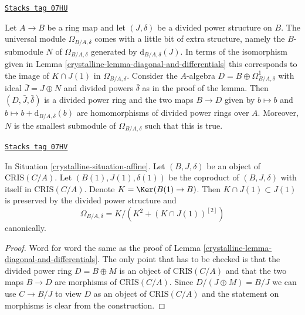 \begin{remark}
\label{crystalline-remark-filtration-differentials}
\href{https://stacks.math.columbia.edu/tag/07HU}{\texttt{Stacks tag 07HU}}

Let $A \to B$ be a ring map and let $(J, \delta)$ be a divided
power structure on $B$. The universal module $\Omega_{B/A, \delta}$
comes with a little bit of extra structure, namely the $B$-submodule
$N$ of $\Omega_{B/A, \delta}$ generated by $\text{d}_{B/A, \delta}(J)$.
In terms of the isomorphism given in
Lemma \ref{crystalline-lemma-diagonal-and-differentials}
this corresponds to the image of
$K \cap J(1)$ in $\Omega_{B/A, \delta}$. Consider the $A$-algebra
$D = B \oplus \Omega^1_{B/A, \delta}$ with ideal $\bar J = J \oplus N$
and divided powers $\bar \delta$ as in the proof of the lemma.
Then $(D, \bar J, \bar \delta)$ is a divided power ring
and the two maps $B \to D$ given by $b \mapsto b$ and
$b \mapsto b + \text{d}_{B/A, \delta}(b)$
are homomorphisms of divided power rings over $A$. Moreover, $N$
is the smallest submodule of $\Omega_{B/A, \delta}$ such that this is true.
\end{remark}

\begin{lemma}
\label{crystalline-lemma-diagonal-and-differentials-affine-site}
\href{https://stacks.math.columbia.edu/tag/07HV}{\texttt{Stacks tag 07HV}}

In Situation \ref{crystalline-situation-affine}.
Let $(B, J, \delta)$ be an object of $\text{CRIS}(C/A)$.
Let $(B(1), J(1), \delta(1))$ be the coproduct of $(B, J, \delta)$
with itself in $\text{CRIS}(C/A)$. Denote
$K = \Ker(B(1) \to B)$. Then $K \cap J(1) \subset J(1)$
is preserved by the divided power structure and
$$
\Omega_{B/A, \delta} = K/ \left(K^2 + (K \cap J(1))^{[2]}\right)
$$
canonically.
\end{lemma}

\begin{proof}

Word for word the same as the proof of
Lemma \ref{crystalline-lemma-diagonal-and-differentials}.
The only point that has to be checked is that the
divided power ring $D = B \oplus M$ is an object of $\text{CRIS}(C/A)$
and that the two maps $B \to D$ are morphisms of $\text{CRIS}(C/A)$.
Since $D/(J \oplus M) = B/J$ we can use $C \to B/J$ to view
$D$ as an object of $\text{CRIS}(C/A)$
and the statement on morphisms is clear from the construction.
\end{proof}

